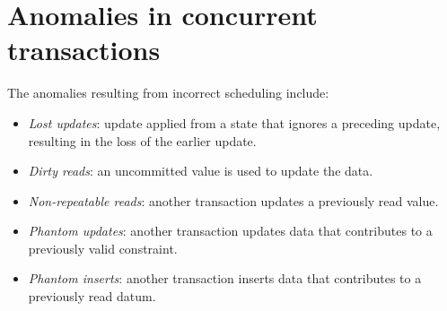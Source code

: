 \section{Anomalies in concurrent transactions}

The anomalies resulting from incorrect scheduling include: 
\begin{itemize}
    \item \textit{Lost updates}: update applied from a state that ignores a preceding update, resulting in the loss of the earlier update.
    \item \textit{Dirty reads}: an uncommitted value is used to update the data.
    \item \textit{Non-repeatable reads}: another transaction updates a previously read value.
    \item \textit{Phantom updates}: another transaction updates data that contributes to a previously valid constraint.
    \item \textit{Phantom inserts}: another transaction inserts data that contributes to a previously read datum.
\end{itemize}